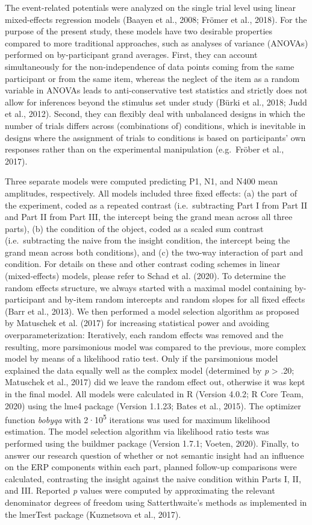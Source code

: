 \documentclass[
  english,
  man,11pt,floatsintext]{apa7}
\begin{document}
The event-related potentials were analyzed on the single trial level using linear mixed-effects regression models (Baayen et al., 2008; Frömer et al., 2018). For the purpose of the present study, these models have two desirable properties compared to more traditional approaches, such as analyses of variance (ANOVAs) performed on by-participant grand averages. First, they can account simultaneously for the non-independence of data points coming from the same participant or from the same item, whereas the neglect of the item as a random variable in ANOVAs leads to anti-conservative test statistics and strictly does not allow for inferences beyond the stimulus set under study (Bürki et al., 2018; Judd et al., 2012). Second, they can flexibly deal with unbalanced designs in which the number of trials differs across (combinations of) conditions, which is inevitable in designs where the assignment of trials to conditions is based on participants' own responses rather than on the experimental manipulation (e.g.~Fröber et al., 2017).

Three separate models were computed predicting P1, N1, and N400 mean amplitudes, respectively. All models included three fixed effects: (a) the part of the experiment, coded as a repeated contrast (i.e.~subtracting Part I from Part II and Part II from Part III, the intercept being the grand mean across all three parts), (b) the condition of the object, coded as a scaled sum contrast (i.e.~subtracting the naive from the insight condition, the intercept being the grand mean across both conditions), and (c) the two-way interaction of part and condition. For details on these and other contrast coding schemes in linear (mixed-effects) models, please refer to Schad et al. (2020). To determine the random effects structure, we always started with a maximal model containing by-participant and by-item random intercepts and random slopes for all fixed effects (Barr et al., 2013). We then performed a model selection algorithm as proposed by Matuschek et al. (2017) for increasing statistical power and avoiding overparameterization: Iteratively, each random effects was removed and the resulting, more parsimonious model was compared to the previous, more complex model by means of a likelihood ratio test. Only if the parsimonious model explained the data equally well as the complex model (determined by \emph{p} \textgreater{} .20; Matuschek et al., 2017) did we leave the random effect out, otherwise it was kept in the final model. All models were calculated in R (Version 4.0.2; R Core Team, 2020) using the lme4 package (Version 1.1.23; Bates et al., 2015). The optimizer function \emph{bobyqa} with 2·10\textsuperscript{5} iterations was used for maximum likelihood estimation. The model selection algorithm via likelihood ratio tests was performed using the buildmer package (Version 1.7.1; Voeten, 2020). Finally, to answer our research question of whether or not semantic insight had an influence on the ERP components within each part, planned follow-up comparisons were calculated, contrasting the insight against the naive condition within Parts I, II, and III. Reported \emph{p} values were computed by approximating the relevant denominator degrees of freedom using Satterthwaite's methods as implemented in the lmerTest package (Kuznetsova et al., 2017).
\end{document}
